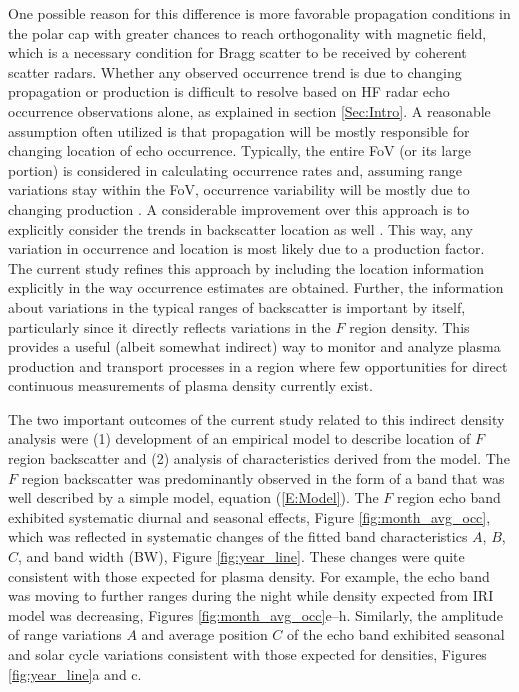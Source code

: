 One possible reason for this difference is more favorable propagation conditions in the polar cap with greater chances to reach orthogonality with magnetic field, which is a necessary condition for Bragg scatter to be received by coherent scatter radars. Whether any observed occurrence trend is due to changing propagation or production is difficult to resolve based on HF radar echo occurrence observations alone, as explained in section \ref{Sec:Intro}. A reasonable assumption often utilized is that propagation will be mostly responsible for changing location of echo occurrence. Typically, the entire FoV (or its large portion) is considered in calculating occurrence rates and, assuming range variations stay within the FoV, occurrence variability will be mostly due to changing production \citep[e.g.][]{Kane2010}. A considerable improvement over this approach is to explicitly consider the trends in backscatter location as well \citep{Kane2012,Ghezelbash2014b}. This way, any variation in occurrence and location is most likely due to a production factor. The current study refines this approach by including the location information explicitly in the way occurrence estimates are obtained. Further, the information about variations in the typical ranges of backscatter is important by itself, particularly since it directly reflects variations in the \(F\) region density. This provides a useful (albeit somewhat indirect) way to monitor and analyze plasma production and transport processes in a region where few opportunities for direct continuous measurements of plasma density currently exist.


The two important outcomes of the current study related to this indirect density analysis were (1) development of an empirical model to describe location of \(F\) region backscatter and (2) analysis of characteristics derived from the model. The \(F\) region backscatter was predominantly observed in the form of a band that was well described by a simple model, equation (\ref{E:Model}). The \(F\) region echo band exhibited systematic diurnal and seasonal effects, Figure \ref{fig:month_avg_occ}, which was reflected in systematic changes of the fitted band characteristics \(A\), \(B\), \(C\), and band width (BW), Figure \ref{fig:year_line}. These changes were quite consistent with those expected for plasma density. For example, the echo band was moving to further ranges during the night while density expected from IRI model was decreasing, Figures \ref{fig:month_avg_occ}e--h. Similarly, the amplitude of range variations \(A\) and average position \(C\) of the echo band exhibited seasonal and solar cycle variations consistent with those expected for densities, Figures \ref{fig:year_line}a and c.

